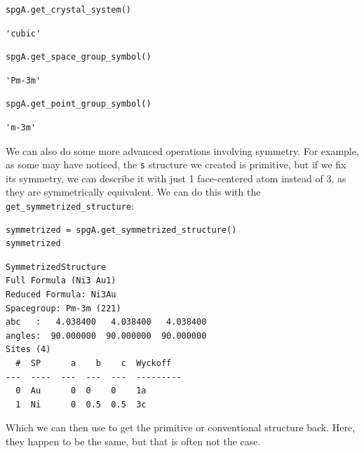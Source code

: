 \begin{verbatim}
spgA.get_crystal_system()
\end{verbatim}

\begin{verbatim}
'cubic'
\end{verbatim}

\begin{verbatim}
spgA.get_space_group_symbol()
\end{verbatim}

\begin{verbatim}
'Pm-3m'
\end{verbatim}

\begin{verbatim}
spgA.get_point_group_symbol()
\end{verbatim}

\begin{verbatim}
'm-3m'
\end{verbatim}

We can also do some more advanced operations involving symmetry. For
example, as some may have noticed, the \texttt{s}
structure we created is primitive, but if we fix its symmetry, we can
describe it with just 1 face-centered atom instead of 3, as they are
symmetrically equivalent. We can do this with the
\texttt{get\_symmetrized\_structure}:

\begin{verbatim}
symmetrized = spgA.get_symmetrized_structure()
symmetrized
\end{verbatim}

\begin{verbatim}
SymmetrizedStructure
Full Formula (Ni3 Au1)
Reduced Formula: Ni3Au
Spacegroup: Pm-3m (221)
abc   :   4.038400   4.038400   4.038400
angles:  90.000000  90.000000  90.000000
Sites (4)
  #  SP      a    b    c  Wyckoff
---  ----  ---  ---  ---  ---------
  0  Au      0  0    0    1a
  1  Ni      0  0.5  0.5  3c
\end{verbatim}

Which we can then use to get the primitive or conventional structure
back. Here, they happen to be the same, but that is often not the case.

